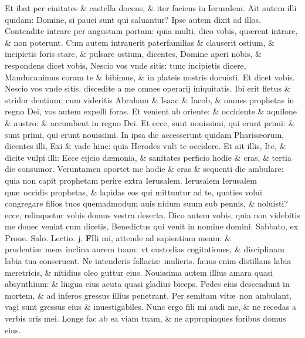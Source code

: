 \documentclass[a5paper,10pt]{book}
\def\leftmarginnote{%
	\lrmarginnote{\hskip -\marginparsep \hskip -6.5em}}
\def\ae{æ}
\begin{document}
\begin{multicols*}{2}
Et ibat per ciuitates \& castella docens, \& iter faciens in Ierusalem.
Ait autem illi quidam: Domine, si pauci sunt qui saluantur?
Ipse autem dixit ad illos. Contendite intrare per angustam portam: quia multi, dico vobis, qu\ae rent intrare, \& non poterunt.
Cum autem intrauerit paterfamilias \& clauserit ostium, \& incipietis foris stare, \& pulsare ostium, dicentes, Domine aperi nobis, \& respondens dicet vobis, Nescio vos vnde sitis: tunc incipietis dicere, Manducauimus coram te \& bibimus, \& in plateis nostris docuisti.
Et dicet vobis. Nescio vos vnde sitis, discedite a me omnes operarij iniquitatis.
Ibi erit fletus \& stridor dentium: cum videritis Abraham \& Isaac \& Iacob, \& omnes prophetas in regno Dei, vos autem expelli foras.
Et venient ab oriente: \& occidente \& aquilone \& austro: \& accumbent in regno Dei.
Et ecce, sunt nouissimi, qui erunt primi: \& sunt primi, qui erunt nouissimi.
In ipsa die accesserunt quidam Pharis\ae orum, dicentes illi, Exi \& vade hinc: quia Herodes vult te occidere.
Et ait illis, Ite, \& dicite vulpi illi: Ecce eijcio d\ae monia, \& sanitates perficio hodie \& cras, \& tertia die consumor.
Veruntamen oportet me hodie \& cras
\& sequenti die ambulare: quia non capit prophetam perire extra Ierusalem.
Ierusalem Ierusalem qu\ae \ occidis prophetas, \& lapidas eos qui mittuntur ad te, quoties volui congregare filios tuos quemadmodum auis nidum suum sub pennis, \& noluisti?
ecce, relinquetur vobis domus vestra deserta. Dico autem vobis, quia non videbitis me donec veniat cum dicetis, Benedictus qui venit in nomine domini.
\newline {} \color{red} \hypertarget{SAT-PRIMA-POST-ADV}{Sabbato,} ex Proue. Salo. \hfill Lectio. j. \color{black}
\vspace{-2.25em}
\lettrine[lines=2]{\bfseries F}{}Ili\leftmarginnote{\begin{flushright}ca. 5.\end{flushright}} mi, attende ad sapientiam meam: \& prudenti\ae \ me\ae \ inclina aurem tuam: vt custodias cogitationes, \& disciplinam labia tua conseruent.
Ne intenderis fallaci\ae \ mulieris. fauus enim distillans labia meretricis, \& nitidius oleo guttur eius.
Nouissima autem illius amara quasi absynthium: \& lingua eius acuta quasi gladius biceps.
Pedes eius descendunt in mortem, \& ad inferos gressus illius penetrant.
Per semitam vit\ae \ non ambulant, vagi sunt gressus eius \& inuestigabiles.
Nunc ergo fili mi audi me, \& ne recedas a verbis oris mei.
\newline Longe fac ab ea viam tuam, \& ne appropinques foribus domus eius.

\end{multicols*}
\end{document}
